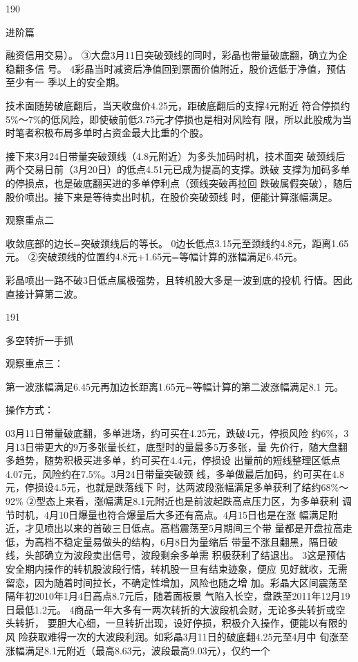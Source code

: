 \documentclass{article}
\begin{document}
190

\clearpage

进阶篇

融资信用交易）。 ③大盘3月11日突破颈线的同时，彩晶也带量破底翻，确立为企稳翻多信 号。 4彩晶当时减资后净值回到票面价值附近，股价远低于净值，预估至少有一 季以上的安全期。

技术面随势破底翻后，当天收盘价4.25元，距破底翻后的支撑4元附近 符合停损约5\%～7\%的低风险，即使破前低3.75元才停损也是相对风险有 限，所以此股成为当时笔者积极布局多单时占资金最大比重的个股。

接下来3月24日带量突破颈线（4.8元附近）为多头加码时机，技术面突 破颈线后两个交易日前（3月20日）的低点4.51元已成为提高的支撑。跌破 支撑为加码多单的停损点，也是破底翻买进的多单停利点（颈线突破再拉回 跌破属假突破），随后股价喷出。接下来是等待卖出时机，在股价突破颈线 时，便能计算涨幅满足。

观察重点二

收敛底部的边长=突破颈线后的等长。 0边长低点3.15元至颈线约4.8元，距离1.65元。 ②突破颈线的位置约4.8元+1.65元=等幅计算的涨幅满足6.45元。

彩晶喷出一路不破3日低点属极强势，且转机股大多是一波到底的投机 行情。因此直接计算第二波。

191

\clearpage

多空转折一手抓

观察重点三：

第一波涨幅满足6.45元再加边长距离1.65元=等幅计算的第二波涨幅满足8.1 元。

操作方式：

03月11日带量破底翻，多单进场，约可买在4.25元，跌破4元，停损风险 约6\%，3月13日带更大的9万多张量长红，底型时的量最多5万多张，量 先价行，随大盘翻多趋势，随势积极买进多单，约可买在4.4元，停损设 出量前的短线整理区低点4.07元，风险约在7.5\%。3月24日带量突破颈 线，多单做最后加码，约可买在4.8元，停损设4.5元，也就是跌落线下 时，达两波段涨幅满足多单获利了结约68\%～92\% ②型态上来看，涨幅满足8.1元附近也是前波起跌高点压力区，为多单获利 调节时机，4月10日爆量也符合爆量后大多还有高点。4月15日也是在涨 幅满足附近，才见喷出以来的首破三日低点。高档震荡至5月期间三个带 量都是开盘拉高走低，为高档不稳定量易做头的结构，6月8日为量缩后 带量不涨且翻黑，隔日破线，头部确立为波段卖出信号，波段剩余多单需 积极获利了结退出。 3这是预估安全期内操作的转机股波段行情，转机股一旦有结束迹象，便应 见好就收，无需留恋，因为随着时间拉长，不确定性增加，风险也随之增 加。彩晶大区间震荡至隔年初2010年1月4日高点8.7元后，随着面板景 气陷入长空，盘跌至2011年12月19日最低1.2元。 4商品一年大多有一两次转折的大波段机会财，无论多头转折或空头转折， 要胆大心细，一旦转折出现，设好停损，积极介入操作，便能以有限的风 险获取难得一次的大波段利润。如彩晶3月11日的破底翻4.25元至4月中 旬涨至涨幅满足8.1元附近（最高8.63元，波段最高9.03元），仅约一个
\end{document}
